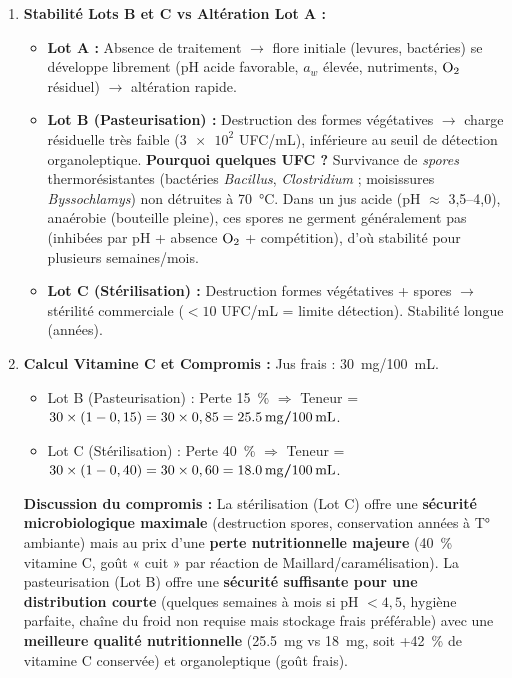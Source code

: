\documentclass[11pt]{article}
\begin{document}
\begin{corrige}
\begin{enumerate}
\item \textbf{Stabilité Lots B et C vs Altération Lot A :}
\begin{itemize}
\item \textbf{Lot A :} Absence de traitement $\to$ flore initiale (levures, bactéries) se développe librement (pH acide favorable, $a_w$ élevée, nutriments, $\ce{O2}$ résiduel) $\to$ altération rapide.
\item \textbf{Lot B (Pasteurisation) :} Destruction des formes végétatives $\to$ charge résiduelle très faible ($\num{3e2}$ UFC/mL), inférieure au seuil de détection organoleptique. \textbf{Pourquoi quelques UFC ?} Survivance de \emph{spores} thermorésistantes (bactéries \emph{Bacillus}, \emph{Clostridium} ; moisissures \emph{Byssochlamys}) non détruites à \SI{70}{\degreeCelsius}. Dans un jus acide (pH $\approx$ 3,5--4,0), anaérobie (bouteille pleine), ces spores ne germent généralement pas (inhibées par pH + absence $\ce{O2}$ + compétition), d'où stabilité pour plusieurs semaines/mois.
\item \textbf{Lot C (Stérilisation) :} Destruction formes végétatives + spores $\to$ stérilité commerciale ($< 10$ UFC/mL = limite détection). Stabilité longue (années).
\end{itemize}

\item \textbf{Calcul Vitamine C et Compromis :}
Jus frais : \SI{30}{\mg}/\SI{100}{\mL}.
\begin{itemize}
\item Lot B (Pasteurisation) : Perte \SI{15}{\%} $\Rightarrow$ Teneur = $30 \times (1 - 0,15) = 30 \times 0,85 = \textbf{\SI{25,5}{\mg}/\SI{100}{\mL}}$.
\item Lot C (Stérilisation) : Perte \SI{40}{\%} $\Rightarrow$ Teneur = $30 \times (1 - 0,40) = 30 \times 0,60 = \textbf{\SI{18,0}{\mg}/\SI{100}{\mL}}$.
\end{itemize}
\textbf{Discussion du compromis :}
La stérilisation (Lot C) offre une \textbf{sécurité microbiologique maximale} (destruction spores, conservation années à T° ambiante) mais au prix d'une \textbf{perte nutritionnelle majeure} (\SI{40}{\%} vitamine C, goût « cuit » par réaction de Maillard/caramélisation). La pasteurisation (Lot B) offre une \textbf{sécurité suffisante pour une distribution courte} (quelques semaines à mois si pH $< 4,5$, hygiène parfaite, chaîne du froid non requise mais stockage frais préférable) avec une \textbf{meilleure qualité nutritionnelle} (\SI{25,5}{\mg} vs \SI{18}{\mg}, soit +\SI{42}{\%} de vitamine C conservée) et organoleptique (goût frais).


\end{enumerate}
\end{corrige}
\end{document}

